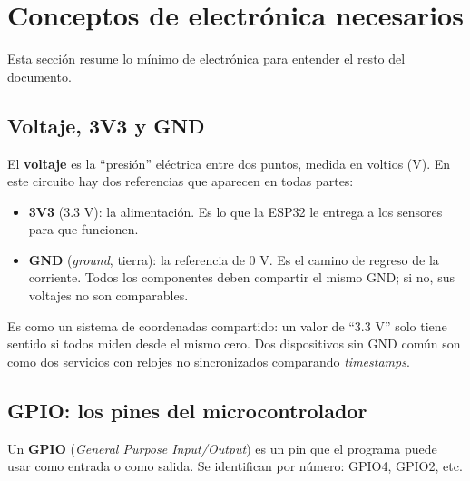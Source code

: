 \documentclass[11pt,a4paper]{article}
\begin{document}
\section{Conceptos de electrónica necesarios}

Esta sección resume lo mínimo de electrónica para entender el resto del documento.

\subsection{Voltaje, 3V3 y GND}

El \textbf{voltaje} es la ``presión'' eléctrica entre dos puntos, medida en voltios (V).
En este circuito hay dos referencias que aparecen en todas partes:

\begin{itemize}[leftmargin=*]
  \item \textbf{3V3} (3.3 V): la alimentación. Es lo que la ESP32 le entrega a los sensores
        para que funcionen.
  \item \textbf{GND} (\emph{ground}, tierra): la referencia de 0 V. Es el camino de regreso
        de la corriente. Todos los componentes deben compartir el mismo GND; si no, sus
        voltajes no son comparables.
\end{itemize}

\begin{analogia}
Es como un sistema de coordenadas compartido: un valor de ``3.3 V'' solo tiene sentido
si todos miden desde el mismo cero. Dos dispositivos sin GND común son como dos
servicios con relojes no sincronizados comparando \emph{timestamps}.
\end{analogia}

\subsection{GPIO: los pines del microcontrolador}

Un \textbf{GPIO} (\emph{General Purpose Input/Output}) es un pin que el programa puede
usar como entrada o como salida. Se identifican por número: GPIO4, GPIO2, etc.
\end{document}
